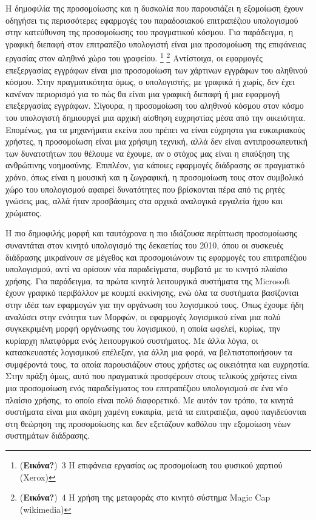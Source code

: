 \documentclass[
]{article}
\begin{document}
Η δημοφιλία της προσομοίωσης και η δυσκολία που παρουσιάζει η εξομοίωση
έχουν οδηγήσει τις περισσότερες εφαρμογές του παραδοσιακού επιτραπέζιου
υπολογισμού στην κατεύθυνση της προσομοίωσης του πραγματικού κόσμου. Για
παράδειγμα, η γραφική διεπαφή στον επιτραπέζιο υπολογιστή είναι μια
προσομοίωση της επιφάνειας εργασίας στον αληθινό χώρο του γραφείου.
\footnote{(\textbf{Εικόνα?})~3 Η επιφάνεια εργασίας ως προσομοίωση του
  φυσικού χαρτιού (Xerox)} \footnote{(\textbf{Εικόνα?})~4 Η χρήση της
  μεταφοράς στο κινητό σύστημα Magic Cap (wikimedia)} Αντίστοιχα, οι
εφαρμογές επεξεργασίας εγγράφων είναι μια προσομοίωση των χάρτινων
εγγράφων του αληθινού κόσμου. Στην πραγματικότητα όμως, ο υπολογιστής,
με γραφικά ή χωρίς, δεν έχει κανέναν περιορισμό για το πώς θα είναι μια
γραφική διεπαφή ή μια εφαρμογή επεξεργασίας εγγράφων. Σίγουρα, η
προσομοίωση του αληθινού κόσμου στον κόσμο του υπολογιστή δημιουργεί μια
αρχική αίσθηση ευχρηστίας μέσα από την οικειότητα. Επομένως, για τα
μηχανήματα εκείνα που πρέπει να είναι εύχρηστα για ευκαιριακούς χρήστες,
η προσομοίωση είναι μια χρήσιμη τεχνική, αλλά δεν είναι αντιπροσωπευτική
των δυνατοτήτων που θέλουμε να έχουμε, αν ο στόχος μας είναι η επαύξηση
της ανθρώπινης νοημοσύνης. Επιπλέον, για κάποιες εφαρμογές διάδρασης σε
πραγματικό χρόνο, όπως είναι η μουσική και η ζωγραφική, η προσομοίωση
τους στον συμβολικό χώρο του υπολογισμού αφαιρεί δυνατότητες που
βρίσκονται πέρα από τις ρητές γνώσεις μας, αλλά ήταν προσβάσιμες στα
αρχικά αναλογικά εργαλεία ήχου και χρώματος.

Η πιο δημοφιλής μορφή και ταυτόχρονα η πιο ιδιάζουσα περίπτωση
προσομοίωσης συναντάται στον κινητό υπολογισμό της δεκαετίας του 2010,
όπου οι συσκευές διάδρασης μικραίνουν σε μέγεθος και προσομοιώνουν τις
εφαρμογές του επιτραπέζιου υπολογισμού, αντί να ορίσουν νέα
παραδείγματα, συμβατά με το κινητό πλαίσιο χρήσης. Για παράδειγμα, τα
πρώτα κινητά λειτουργικά συστήματα της Microsoft έχουν γραφικό
περιβάλλον με κουμπί εκκίνησης, ενώ όλα τα συστήματα βασίζονται στην
ιδέα των εφαρμογών για την οργάνωση του λογισμικού τους. Όπως έχουμε ήδη
αναλύσει στην ενότητα των Μορφών, οι εφαρμογές λογισμικού είναι μια πολύ
συγκεκριμένη μορφή οργάνωσης του λογισμικού, η οποία ωφελεί, κυρίως, την
κυρίαρχη πλατφόρμα ενός λειτουργικού συστήματος. Με άλλα λόγια, οι
κατασκευαστές λογισμικού επέλεξαν, για άλλη μια φορά, να
βελτιστοποιήσουν τα συμφέροντά τους, τα οποία παρουσιάζουν στους χρήστες
ως οικειότητα και ευχρηστία. Στην πράξη όμως, αυτό που πραγματικά
προσφέρουν στους τελικούς χρήστες είναι μια προσομοίωση ενός
παραδείγματος του επιτραπέζιου υπολογισμού σε ένα νέο πλαίσιο χρήσης, το
οποίο είναι πολύ διαφορετικό. Με αυτόν τον τρόπο, τα κινητά συστήματα
είναι μια ακόμη χαμένη ευκαιρία, μετά τα επιτραπέζια, αφού παγιδεύονται
στη θεώρηση της προσομοίωσης και δεν εξετάζουν καθόλου την εξομοίωση
νέων συστημάτων διάδρασης.
\end{document}
